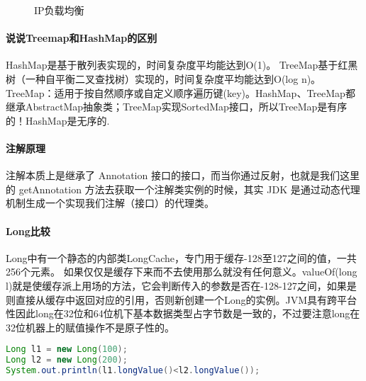 \documentclass[../../../interview-questions.tex]{subfiles}
\begin{document}
\begin{figure}[htpb]
	\centering
	\caption{IP负载均衡}
	\label{fig:iploadbalance}
\end{figure}

\paragraph{说说Treemap和HashMap的区别}

HashMap是基于散列表实现的，时间复杂度平均能达到O(1)。 TreeMap基于红黑树（一种自平衡二叉查找树）实现的，时间复杂度平均能达到O(log n)。TreeMap：适用于按自然顺序或自定义顺序遍历键(key)。HashMap、TreeMap都继承AbstractMap抽象类；TreeMap实现SortedMap接口，所以TreeMap是有序的！HashMap是无序的.


\paragraph{注解原理}

注解本质上是继承了 Annotation 接口的接口，而当你通过反射，也就是我们这里的 getAnnotation 方法去获取一个注解类实例的时候，其实 JDK 是通过动态代理机制生成一个实现我们注解（接口）的代理类。

\paragraph{Long比较}

Long中有一个静态的内部类LongCache，专门用于缓存-128至127之间的值，一共256个元素。
如果仅仅是缓存下来而不去使用那么就没有任何意义。valueOf(long l)就是使缓存派上用场的方法，它会判断传入的参数是否在-128-127之间，如果是则直接从缓存中返回对应的引用，否则新创建一个Long的实例。JVM具有跨平台性因此long在32位和64位机下基本数据类型占字节数是一致的，不过要注意long在32位机器上的赋值操作不是原子性的。

\begin{lstlisting}[language=Java]
Long l1 = new Long(100);
Long l2 = new Long(200);
System.out.println(l1.longValue()<l2.longValue());
\end{lstlisting}
\end{document}
